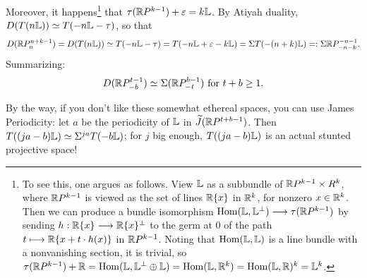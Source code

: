 Moreover, it happens\footnote{To see this, one argues as follows. View $\mathbb{L}$ as a subbundle of $\mathbb{R} P^{k-1}\times R^k$, where $\mathbb{R} P^{k-1}$ is viewed as the set of lines $\mathbb{R}\{x\}$ in $\mathbb{R}^k$, for nonzero $x\in\mathbb{R}^k$. Then we can produce a bundle isomorphism $\operatorname{Hom}(\mathbb{L},\mathbb{L}^\perp)\longrightarrow\tau(\mathbb{R} P^{k-1})$ by sending $h:\mathbb{R}\{x\}\longrightarrow \mathbb{R}\{x\}^\perp$ to the germ at $0$ of the path $t\longmapsto \mathbb{R}\{x+t\cdot h(x)\}$ in $\mathbb{R} P^{k-1}$. Noting that $\operatorname{Hom}(\mathbb{L},\mathbb{L})$ is a line bundle with a nonvanishing section, it is trivial, so $\tau(\mathbb{R} P^{k-1})+\mathbb{R}=\operatorname{Hom}(\mathbb{L},\mathbb{L}^\perp\oplus\mathbb{L})=\operatorname{Hom}(\mathbb{L},\mathbb{R}^k)=\operatorname{Hom}(\mathbb{L},\mathbb{R})^k=\mathbb{L}^k$.} that $\tau(\mathbb{R} P^{k-1}) + \varepsilon = k \mathbb{L}$.
By Atiyah duality, $D(T(n\mathbb{L})) \simeq T(-n \mathbb{L} - \tau)$, so that
\[D(\mathbb{R} P^{n+k-1}_n) = D(T(n\mathbb{L})) \simeq T(-n \mathbb{L} - \tau) = T(-n \mathbb{L} + \varepsilon -k \mathbb{L}) = \Sigma T(-(n+k)\mathbb{L}) =: \Sigma \mathbb{R} P^{-n-1}_{-n-k}.\]
Summarizing:
\[D(\mathbb{R} P^{t-1}_{-b}) \simeq \Sigma (\mathbb{R} P^{b-1}_{-t})\text{ for }t+b\geq1.\]

By the way, if you don't like these somewhat ethereal spaces, you can use James Periodicity: let $a$ be the periodicity of $\mathbb{L}$ in $\widetilde J(\mathbb{R} P^{t+b-1})$.  Then $T((ja-b)\mathbb{L}) \simeq \Sigma^{ja} T(-b \mathbb{L})$; for $j$ big enough, $T((ja-b)\mathbb{L})$ is an actual stunted projective space!

